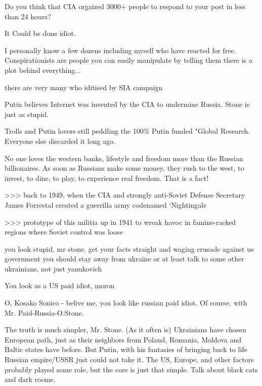 \begin{itemize}
Do you think that CIA orgaized 3000+ people to respond to your post in less
than 24 hours?

\begin{itemize} %
It Could be done idiot.


I personally know a few dozens including myself who have reacted for free.
Conspirationists are people you can easily manipulate by telling them there is
a plot behind everything...


there are very many who iditised
by SIA campaign

Putin believes Internet was invented by the CIA to undermine Russia. Stone is just as stupid.

Trolls and Putin lovers still peddling the 100\% Putin funded "Global Research. Everyone else discarded it long ago.


No one loves the western banks, lifestyle and freedom more than the Russian
billionaires. As soon as Russians make some money, they rush to the west, to
invest, to dine, to play, to experience real freedom. That is a fact!

\end{itemize} %


>>> back to 1949, when the CIA and strongly anti-Soviet Defense Secretary James
Forrestal created a guerrilla army codenamed ‘Nightingale

>>> prototype of this militia up in 1941 to wreak havoc in famine-racked
regions where Soviet control was loose

you look stupid, mr stone. get your facts straight and waging crusade against
us government you should stay away from ukraine or at least talk to some other
ukrainians, not just yanukovich

\begin{itemize} %
You look as a US paid idiot, moron

O, Kosako Sonico - belive me, you look like russian paid idiot. Of course, with Mr. Paid-Russia-O.Stone.
\end{itemize} %


The truth is much simpler, Mr. Stone. (As it often is) Ukrainians have chosen
European path, just as their neighbors from Poland, Romania, Moldova and Baltic
states have before. But Putin, with his fantasies of bringing back to life
Russian empire/USSR just could not take it. The US, Europe, and other factors
probably played some role, but the core is just that simple. Talk about black
cats and dark rooms.


\end{itemize}

